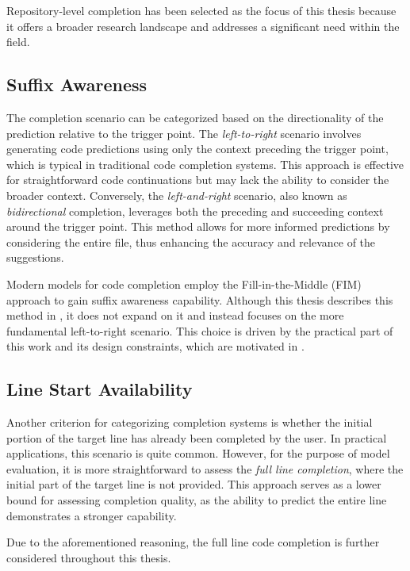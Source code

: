 Repository-level completion has been selected as the focus of this thesis because it offers a broader research landscape and addresses a significant need within the field.

\subsection{Suffix Awareness}

The completion scenario can be categorized based on the directionality of the prediction relative to the trigger point. The \textit{left-to-right} scenario involves generating code predictions using only the context preceding the trigger point, which is typical in traditional code completion systems. This approach is effective for straightforward code continuations but may lack the ability to consider the broader context. Conversely, the \textit{left-and-right} scenario, also known as \textit{bidirectional} completion, leverages both the preceding and succeeding context around the trigger point. This method allows for more informed predictions by considering the entire file, thus enhancing the accuracy and relevance of the suggestions.

Modern models for code completion employ the Fill-in-the-Middle (FIM) approach to gain suffix awareness capability. Although this thesis describes this method in , it does not expand on it and instead focuses on the more fundamental left-to-right scenario. This choice is driven by the practical part of this work and its design constraints, which are motivated in .

\subsection{Line Start Availability}

Another criterion for categorizing completion systems is whether the initial portion of the target line has already been completed by the user. In practical applications, this scenario is quite common. However, for the purpose of model evaluation, it is more straightforward to assess the \textit{full line completion}, where the initial part of the target line is not provided. This approach serves as a lower bound for assessing completion quality, as the ability to predict the entire line demonstrates a stronger capability.

Due to the aforementioned reasoning, the full line code completion is further considered throughout this thesis.

